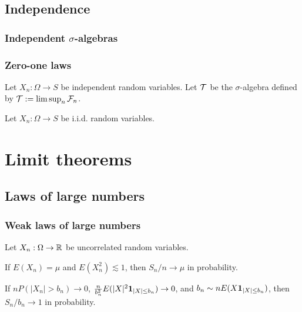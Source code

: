 \documentclass{../note}
\begin{document}
\chapter{Independence}

\section{Independent $\sigma$-algebras}

\section{Zero-one laws}

\begin{prb}
Let $X_n:\Omega\to S$ be independent random variables.
Let $\mathcal{T}$ be the $\sigma$-algebra defined by $\mathcal{T}:=\limsup_n\mathcal{F}_n$.
\end{prb}



\begin{prb}
Let $X_n:\Omega\to S$ be i.i.d. random variables.

\end{prb}


















\part{Limit theorems}
\chapter{Laws of large numbers}

\section{Weak laws of large numbers}
\begin{prb}
Let $X_n:\Omega\to\mathbb{R}$ be uncorrelated random variables.
\begin{parts}
\item If $E(X_n)=\mu$ and $E(X_n^2)\lesssim1$, then $S_n/n\to\mu$ in probability.
\item If $nP(|X_n|>b_n)\to0$, $\frac n{b_n^2}E(|X|^2\mathbf{1}_{|X|\le b_n})\to0$, and $b_n\sim nE(X\mathbf{1}_{|X|\le b_n})$, then $S_n/b_n\to1$ in probability.
\end{parts}

\end{prb}
\end{document}
